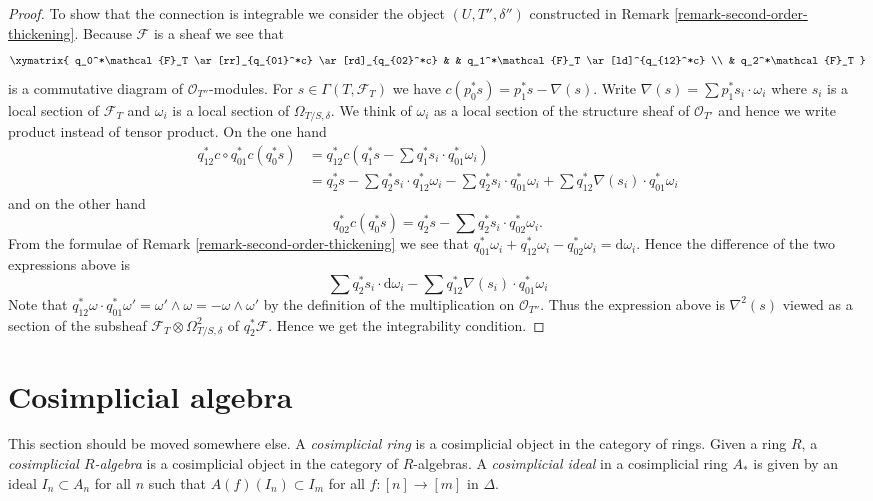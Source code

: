 \begin{proof}
\medskip\noindent
To show that the connection is integrable we consider the
object $(U, T'', \delta'')$ constructed in
Remark \ref{remark-second-order-thickening}.
Because $\mathcal{F}$ is a sheaf we see that
$$
\xymatrix{
q_0^*\mathcal{F}_T \ar[rr]_{q_{01}^*c} \ar[rd]_{q_{02}^*c} & &
q_1^*\mathcal{F}_T \ar[ld]^{q_{12}^*c} \\
& q_2^*\mathcal{F}_T
}
$$
is a commutative diagram of $\mathcal{O}_{T''}$-modules. For
$s \in \Gamma(T, \mathcal{F}_T)$ we have
$c(p_0^*s) = p_1^*s - \nabla(s)$. Write
$\nabla(s) = \sum p_1^*s_i \cdot \omega_i$ where $s_i$ is a local section
of $\mathcal{F}_T$ and $\omega_i$ is a local section of $\Omega_{T/S, \delta}$.
We think of $\omega_i$ as a local section of the structure
sheaf of $\mathcal{O}_{T'}$ and hence we write product instead of tensor
product. On the one hand
\begin{align*}
q_{12}^*c \circ q_{01}^*c(q_0^*s) & = 
q_{12}^*c(q_1^*s - \sum q_1^*s_i \cdot q_{01}^*\omega_i) \\
& =
q_2^*s - \sum q_2^*s_i \cdot q_{12}^*\omega_i -
\sum q_2^*s_i \cdot q_{01}^*\omega_i +
\sum q_{12}^*\nabla(s_i) \cdot q_{01}^*\omega_i
\end{align*}
and on the other hand
$$
q_{02}^*c(q_0^*s) = q_2^*s - \sum q_2^*s_i \cdot q_{02}^*\omega_i.
$$
From the formulae of Remark \ref{remark-second-order-thickening} we see
that
$q_{01}^*\omega_i + q_{12}^*\omega_i - q_{02}^*\omega_i = \text{d}\omega_i$.
Hence the difference of the two expressions above is
$$
\sum q_2^*s_i \cdot \text{d}\omega_i -
\sum q_{12}^*\nabla(s_i) \cdot q_{01}^*\omega_i
$$
Note that
$q_{12}^*\omega \cdot q_{01}^*\omega' = \omega' \wedge \omega =
- \omega \wedge \omega'$ by the definition of the multiplication on
$\mathcal{O}_{T''}$. Thus the expression above is $\nabla^2(s)$ viewed
as a section of the subsheaf $\mathcal{F}_T \otimes \Omega^2_{T/S, \delta}$ of
$q_2^*\mathcal{F}$. Hence we get the integrability condition.
\end{proof}




\section{Cosimplicial algebra}
\label{section-cosimplicial}

\noindent
This section should be moved somewhere else. A
{\it cosimplicial ring} is a cosimplicial object
in the category of rings. Given a ring $R$, a
{\it cosimplicial $R$-algebra} is a cosimplicial object in the
category of $R$-algebras. A {\it cosimplicial ideal} in a cosimplicial
ring $A_*$ is given by an ideal $I_n \subset A_n$ for all $n$ such
that $A(f)(I_n) \subset I_m$ for all $f : [n] \to [m]$ in $\Delta$.

